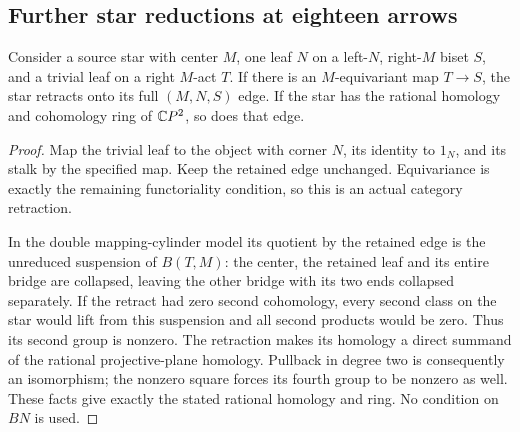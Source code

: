 \subsection{Further star reductions at eighteen arrows}

\begin{lemma}
\label{CP2:A-star-general-leaf-merge}
Consider a source star with center $M$, one leaf $N$ on a
left-$N$, right-$M$ biset $S$, and a trivial leaf on a right
$M$-act $T$. If there is an $M$-equivariant map $T\to S$,
the star retracts onto its full $(M,N,S)$ edge. If the star
has the rational homology and cohomology ring of $\mathbb{C}P^2$,
so does that edge.
\end{lemma}
\begin{proof}
Map the trivial leaf to the object with corner $N$, its
identity to $1_N$, and its stalk by the specified map.
Keep the retained edge unchanged. Equivariance is exactly
the remaining functoriality condition, so this is an actual
category retraction.

In the double mapping-cylinder model its quotient by the
retained edge is the unreduced suspension of $B(T,M)$:
the center, the retained leaf and its entire bridge are
collapsed, leaving the other bridge with its two ends
collapsed separately. If the retract had zero second
cohomology, every second class on the star would lift from
this suspension and all second products would be zero.
Thus its second group is nonzero. The retraction makes its
homology a direct summand of the rational projective-plane
homology. Pullback in degree two is consequently an
isomorphism; the nonzero square forces its fourth group
to be nonzero as well. These facts give exactly the stated
rational homology and ring. No condition on $BN$ is used.
\end{proof}

